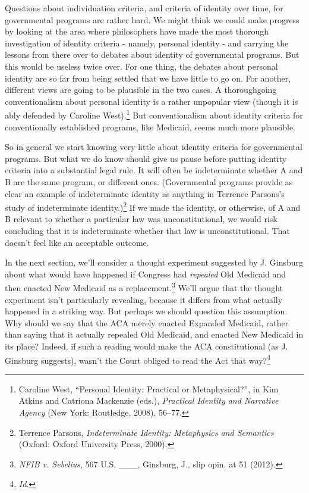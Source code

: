 \documentclass[
  11pt,
  letterpaper,
  DIV=11,
  numbers=noendperiod,
  twoside]{scrartcl}
\begin{document}
Questions about individuation criteria, and criteria of identity over
time, for governmental programs are rather hard. We might think we could
make progress by looking at the area where philosophers have made the
most thorough investigation of identity criteria - namely, personal
identity - and carrying the lessons from there over to debates about
identity of governmental programs. But this would be useless twice over.
For one thing, the debates about personal identity are so far from being
settled that we have little to go on. For another, different views are
going to be plausible in the two cases. A thoroughgoing conventionalism
about personal identity is a rather unpopular view (though it is ably
defended by Caroline West).\footnote{Caroline West, ``Personal Identity:
  Practical or Metaphysical?'', in Kim Atkins and Catriona Mackenzie
  (eds.), \emph{Practical Identity and Narrative Agency} (New York:
  Routledge, 2008), 56--77.} But conventionalism about identity criteria
for conventionally established programs, like Medicaid, seems much more
plausible.

So in general we start knowing very little about identity criteria for
governmental programs. But what we do know should give us pause before
putting identity criteria into a substantial legal rule. It will often
be indeterminate whether A and B are the same program, or different
ones. (Governmental programs provide as clear an example of
indeterminate identity as anything in Terrence Parsons's study of
indeterminate identity.)\footnote{Terrence Parsons, \emph{Indeterminate
  Identity: Metaphysics and Semantics} (Oxford: Oxford University Press,
  2000).} If we made the identity, or otherwise, of A and B relevant to
whether a particular law was unconstitutional, we would risk concluding
that it is indeterminate whether that law is unconstitutional. That
doesn't feel like an acceptable outcome.

In the next section, we'll consider a thought experiment suggested by J.
Ginsburg about what would have happened if Congress had \emph{repealed}
Old Medicaid and then enacted New Medicaid as a replacement.\footnote{\emph{NFIB
  v. Sebelius}, 567 U.S. \_\_\_, Ginsburg, J., slip opin. at 51 (2012).}
We'll argue that the thought experiment isn't particularly revealing,
because it differs from what actually happened in a striking way. But
perhaps we should question this assumption. Why should we say that the
ACA merely enacted Expanded Medicaid, rather than saying that it
actually repealed Old Medicaid, and enacted New Medicaid in its place?
Indeed, if such a reading would make the ACA constitutional (as J.
Ginsburg suggests), wasn't the Court obliged to read the Act that
way?\footnote{\emph{Id}.}
\end{document}
